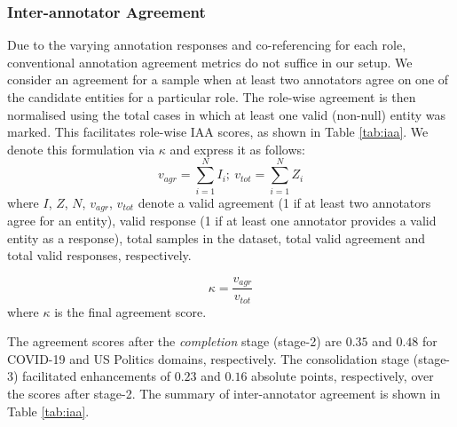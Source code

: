 \documentclass[11pt]{article}
\begin{document}
\subsubsection{Inter-annotator Agreement}
Due to the varying annotation responses and co-referencing for each role, conventional annotation agreement metrics do not suffice in our setup. We consider an agreement for a sample when at least two annotators agree on one of the candidate entities for a particular role. The role-wise agreement is then normalised using the total cases in which at least one valid (non-null) entity was marked. This facilitates role-wise IAA scores, as shown in Table  \ref{tab:iaa}. We denote this formulation via $\kappa$ and express it as follows:
\begin{equation}
    v_{agr} = \sum_{i=1}^{N}I_{i};~v_{tot} = \sum_{i=1}^{N}Z_{i}
\end{equation}
where $I$, $Z$, $N$, $v_{agr}$, $v_{tot}$ denote a valid agreement (1 if at least two annotators agree for an entity), valid response (1 if at least one annotator provides a valid entity as a response), total samples in the dataset, total valid agreement and total valid responses, respectively.

\begin{equation}
    \kappa = \frac{v_{agr}}{v_{tot}}
\end{equation}
where $\kappa$ is the final agreement score. 
    

The agreement scores after the \textit{completion} stage (stage-2) are $0.35$ and $0.48$ for COVID-19 and US Politics domains, respectively. The consolidation stage (stage-3) facilitated enhancements of $0.23$ and $0.16$ absolute points, respectively, over the scores after stage-2. The summary of inter-annotator agreement is shown in Table \ref{tab:iaa}.
\end{document}
